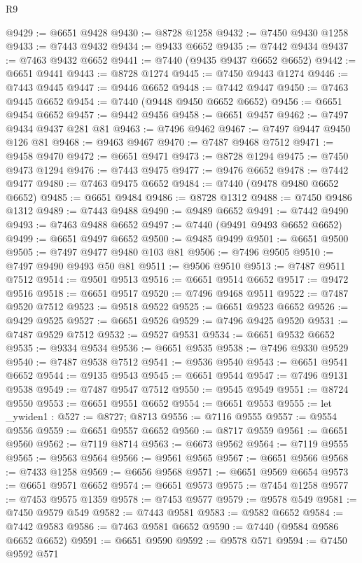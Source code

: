 \begin{lexlean}{R9}
\begin{coremodule}
{{{{{{{{{{{{{{{{{{{{{{{{{{{{{{{{{{{{{{{{{{{{{{{{{{{{{{{{{{{{{{{{{{{{{{{{{{{{{{{{{{{{@9429 := @6651 @9428
@9430 := @8728 @1258
@9432 := @7450 @9430 @1258
@9433 := @7443 @9432
@9434 := @9433 @6652
@9435 := @7442 @9434
@9437 := @7463 @9432 @6652
@9441 := @7440 (@9435 @9437 @6652 @6652)
@9442 := @6651 @9441
@9443 := @8728 @1274
@9445 := @7450 @9443 @1274
@9446 := @7443 @9445
@9447 := @9446 @6652
@9448 := @7442 @9447
@9450 := @7463 @9445 @6652
@9454 := @7440 (@9448 @9450 @6652 @6652)
@9456 := @6651 @9454 @6652
@9457 := @9442 @9456
@9458 := @6651 @9457
@9462 := @7497 @9434 @9437 @281 @81
@9463 := @7496 @9462
@9467 := @7497 @9447 @9450 @126 @81
@9468 := @9463 @9467
@9470 := @7487 @9468 @7512
@9471 := @9458 @9470
@9472 := @6651 @9471
@9473 := @8728 @1294
@9475 := @7450 @9473 @1294
@9476 := @7443 @9475
@9477 := @9476 @6652
@9478 := @7442 @9477
@9480 := @7463 @9475 @6652
@9484 := @7440 (@9478 @9480 @6652 @6652)
@9485 := @6651 @9484
@9486 := @8728 @1312
@9488 := @7450 @9486 @1312
@9489 := @7443 @9488
@9490 := @9489 @6652
@9491 := @7442 @9490
@9493 := @7463 @9488 @6652
@9497 := @7440 (@9491 @9493 @6652 @6652)
@9499 := @6651 @9497 @6652
@9500 := @9485 @9499
@9501 := @6651 @9500
@9505 := @7497 @9477 @9480 @103 @81
@9506 := @7496 @9505
@9510 := @7497 @9490 @9493 @50 @81
@9511 := @9506 @9510
@9513 := @7487 @9511 @7512
@9514 := @9501 @9513
@9516 := @6651 @9514 @6652
@9517 := @9472 @9516
@9518 := @6651 @9517
@9520 := @7496 @9468 @9511
@9522 := @7487 @9520 @7512
@9523 := @9518 @9522
@9525 := @6651 @9523 @6652
@9526 := @9429 @9525
@9527 := @6651 @9526
@9529 := @7496 @9425 @9520
@9531 := @7487 @9529 @7512
@9532 := @9527 @9531
@9534 := @6651 @9532 @6652
@9535 := @9334 @9534
@9536 := @6651 @9535
@9538 := @7496 @9330 @9529
@9540 := @7487 @9538 @7512
@9541 := @9536 @9540
@9543 := @6651 @9541 @6652
@9544 := @9135 @9543
@9545 := @6651 @9544
@9547 := @7496 @9131 @9538
@9549 := @7487 @9547 @7512
@9550 := @9545 @9549
@9551 := @8724 @9550
@9553 := @6651 @9551 @6652
@9554 := @6651 @9553
@9555 := let _ywiden1 : @527 := @8727; @8713
@9556 := @7116 @9555
@9557 := @9554 @9556
@9559 := @6651 @9557 @6652
@9560 := @8717 @9559
@9561 := @6651 @9560
@9562 := @7119 @8714
@9563 := @6673 @9562
@9564 := @7119 @9555
@9565 := @9563 @9564
@9566 := @9561 @9565
@9567 := @6651 @9566
@9568 := @7433 @1258
@9569 := @6656 @9568
@9571 := @6651 @9569 @6654
@9573 := @6651 @9571 @6652
@9574 := @6651 @9573
@9575 := @7454 @1258
@9577 := @7453 @9575 @1359
@9578 := @7453 @9577
@9579 := @9578 @549
@9581 := @7450 @9579 @549
@9582 := @7443 @9581
@9583 := @9582 @6652
@9584 := @7442 @9583
@9586 := @7463 @9581 @6652
@9590 := @7440 (@9584 @9586 @6652 @6652)
@9591 := @6651 @9590
@9592 := @9578 @571
@9594 := @7450 @9592 @571
}}}}}}}}}}}}}}}}}}}}}}}}}}}}}}}}}}}}}}}}}}}}}}}}}}}}}}}}}}}}}}}}}}}}}}}}}}}}}}}}}}}}
\end{coremodule}
\end{lexlean}
